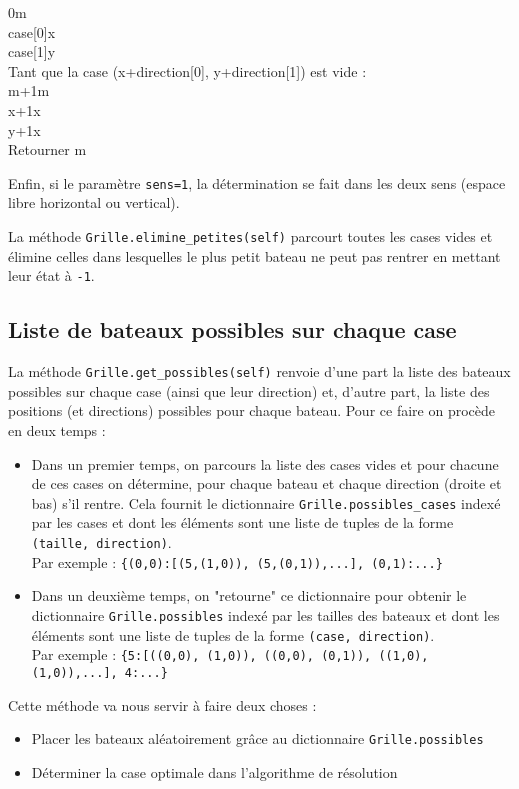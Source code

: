 \begin{algo1}
0\sto m\\
case[0]\sto x\\
case[1]\sto y\\
Tant que la case (x+direction[0], y+direction[1]) est vide :\\
 m+1\sto m\\
 x+1\sto x\\
 y+1\sto x\\
Retourner m\\
\end{algo1}

Enfin, si le paramètre \texttt{sens=1}, la détermination se fait dans les deux sens (espace libre horizontal ou vertical).

La méthode \texttt{Grille.elimine\_petites(self)} parcourt toutes les cases vides et élimine celles dans lesquelles le plus petit bateau ne peut pas rentrer en mettant leur état à \texttt{-1}.

\subsection{Liste de bateaux possibles sur chaque case}
La méthode \texttt{Grille.get\_possibles(self)} renvoie d'une part la liste des bateaux possibles sur chaque case (ainsi que leur direction) et, d'autre part, la liste des positions (et directions) possibles pour chaque bateau. Pour ce faire on procède en deux temps :
\begin{itemize}
\item Dans un premier temps, on parcours la liste des cases vides et pour chacune de ces cases on détermine, pour chaque bateau et chaque direction (droite et bas) s'il rentre. Cela fournit le dictionnaire \texttt{Grille.possibles\_cases} indexé par les cases et dont les éléments sont une liste de tuples de la forme \texttt{(taille, direction)}.\\
Par exemple : \texttt{\{(0,0):[(5,(1,0)), (5,(0,1)),...], (0,1):...\}}
\item Dans un deuxième temps, on "retourne" ce dictionnaire pour obtenir le dictionnaire \texttt{Grille.possibles} indexé par les tailles des bateaux et dont les éléments sont une liste de tuples de la forme \texttt{(case, direction)}.\\
Par exemple : \texttt{\{5:[((0,0), (1,0)), ((0,0), (0,1)), ((1,0), (1,0)),...], 4:...\}}
\end{itemize}

Cette méthode va nous servir à faire deux choses :
\begin{itemize}
\item Placer les bateaux aléatoirement grâce au dictionnaire \texttt{Grille.possibles}
\item Déterminer la case optimale dans l'algorithme de résolution
\end{itemize}

